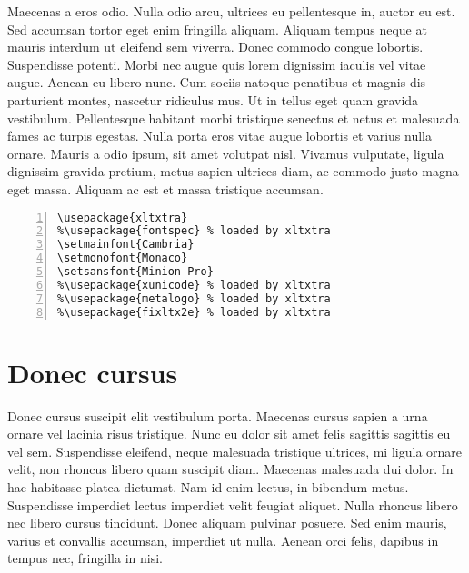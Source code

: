 Maecenas a eros odio. Nulla odio arcu, ultrices eu pellentesque in, auctor eu est. Sed accumsan tortor eget enim fringilla aliquam. Aliquam tempus neque at mauris interdum ut eleifend sem viverra. Donec commodo congue lobortis. Suspendisse potenti. Morbi nec augue quis lorem dignissim iaculis vel vitae augue. Aenean eu libero nunc. Cum sociis natoque penatibus et magnis dis parturient montes, nascetur ridiculus mus. Ut in tellus eget quam gravida vestibulum. Pellentesque habitant morbi tristique senectus et netus et malesuada fames ac turpis egestas. Nulla porta eros vitae augue lobortis et varius nulla ornare. Mauris a odio ipsum, sit amet volutpat nisl. Vivamus vulputate, ligula dignissim gravida pretium, metus sapien ultrices diam, ac commodo justo magna eget massa. Aliquam ac est et massa tristique accumsan. 

\begin{Verbatim}[numbers=left, framerule=1pt]
% see http://www.ctan.org/tex-archive/macros/xetex/latex/xltxtra/xltxtra.pdf
\usepackage{xltxtra} 
%\usepackage{fontspec} % loaded by xltxtra
\setmainfont{Cambria}
\setmonofont{Monaco}
\setsansfont{Minion Pro}
%\usepackage{xunicode} % loaded by xltxtra
%\usepackage{metalogo} % loaded by xltxtra
%\usepackage{fixltx2e} % loaded by xltxtra
\end{Verbatim}

\section{Donec cursus}

Donec cursus suscipit elit vestibulum porta. Maecenas cursus sapien a urna ornare vel lacinia risus tristique. Nunc eu dolor sit amet felis sagittis sagittis eu vel sem. Suspendisse eleifend, neque malesuada tristique ultrices, mi ligula ornare velit, non rhoncus libero quam suscipit diam. Maecenas malesuada dui dolor. In hac habitasse platea dictumst. Nam id enim lectus, in bibendum metus. Suspendisse imperdiet lectus imperdiet velit feugiat aliquet. Nulla rhoncus libero nec libero cursus tincidunt. Donec aliquam pulvinar posuere. Sed enim mauris, varius et convallis accumsan, imperdiet ut nulla. Aenean orci felis, dapibus in tempus nec, fringilla in nisi. 

\providecommand{\mcol}[2]{\multicolumn{#1}{c}{#2}}
\providecommand{\mcoll}[2]{\multicolumn{#1}{@{}l@{}}{#2}}

\providecommand{\emptycell}{\mcol{3}{---}}
\providecommand{\minussign}{-}


